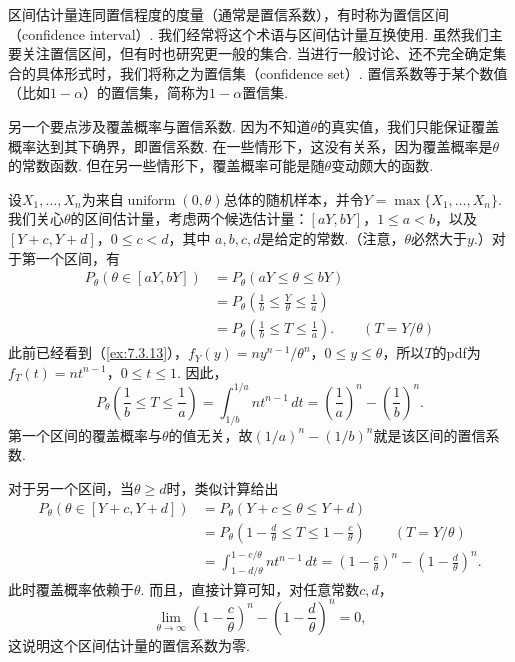 区间估计量连同置信程度的度量（通常是置信系数），有时称为置信区间（confidence interval）. 我们经常将这个术语与区间估计量互换使用. 虽然我们主要关注置信区间，但有时也研究更一般的集合. 当进行一般讨论、还不完全确定集合的具体形式时，我们将称之为置信集（confidence set）. 置信系数等于某个数值（比如$1-\alpha$）的置信集，简称为$1-\alpha$置信集.

另一个要点涉及覆盖概率与置信系数. 因为不知道$\theta$的真实值，我们只能保证覆盖概率达到其下确界，即置信系数. 在一些情形下，这没有关系，因为覆盖概率是$\theta$的常数函数. 但在另一些情形下，覆盖概率可能是随$\theta$变动颇大的函数.
\begin{example}[尺度均匀分布的区间估计量]\label{ex:9.1.6}
设$X_1,\ldots,X_n$为来自$\operatorname{uniform}(0,\theta)$总体的随机样本，并令$Y=\max\{X_1,\ldots,X_n\}$. 我们关心$\theta$的区间估计量，考虑两个候选估计量：$[aY,bY]$，$1\le a<b$，以及$[Y+c,Y+d]$，$0\le c<d$，其中
$a,b,c,d$是给定的常数.（注意，$\theta$必然大于$y$.）对于第一个区间，有
$$\begin{aligned}
P_\theta(\theta\in[aY,bY])&=P_\theta(aY\le\theta\le bY)\\
&=P_\theta\left(\frac1b\le\frac Y\theta\le\frac1a\right)\\
&=P_\theta\left(\frac1b\le T\le\frac1a\right).\qquad(T=Y/\theta)
\end{aligned}$$
此前已经看到（\autoref{ex:7.3.13}），$f_Y(y)=ny^{n-1}/\theta^n$，$0\le y\le\theta$，所以$T$的pdf为$f_T(t)=nt^{n-1}$，$0\le t\le1$. 因此，
$$P_\theta\left(\frac1b\le T\le\frac1a\right)=\int_{1/b}^{1/a}nt^{n-1}\,dt=\left(\frac1a\right)^n-\left(\frac1b\right)^n.$$
第一个区间的覆盖概率与$\theta$的值无关，故$(1/a)^n-(1/b)^n$就是该区间的置信系数.

对于另一个区间，当$\theta\ge d$时，类似计算给出
$$\begin{aligned}
P_\theta(\theta\in[Y+c,Y+d])&=P_\theta(Y+c\le\theta\le Y+d)\\
&=P_\theta\left(1-\frac d\theta\le T\le1-\frac c\theta\right)\qquad(T=Y/\theta)\\
&=\int_{1-d/\theta}^{1-c/\theta}nt^{n-1}\,dt
=\left(1-\frac c\theta\right)^n-\left(1-\frac d\theta\right)^n.
\end{aligned}$$
此时覆盖概率依赖于$\theta$. 而且，直接计算可知，对任意常数$c,d$，
$$\lim_{\theta\to\infty}\left(1-\frac c\theta\right)^n-\left(1-\frac d\theta\right)^n=0,$$
这说明这个区间估计量的置信系数为零.
\end{example}
